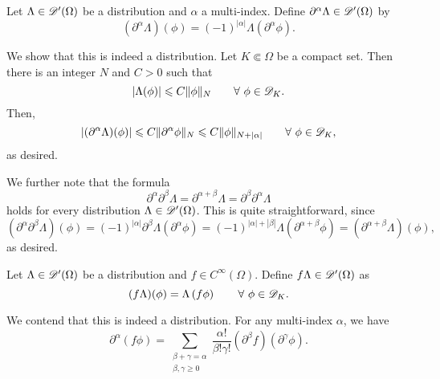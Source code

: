 \begin{definition}
    Let $\Lambda\in\mathscr{D}'(\Omega)$ be a distribution and $\alpha$ a multi-index. Define $\partial^\alpha\Lambda\in\mathscr{D}'(\Omega)$ by 
    \begin{equation*}
        \left(\partial^\alpha\Lambda\right)(\phi) = (-1)^{|\alpha|}\Lambda\left(\partial^\alpha\phi\right).
    \end{equation*}
\end{definition}

We show that this is indeed a distribution. Let $K\Subset\Omega$ be a compact set. Then there is an integer $N$ and $C > 0$ such that 
\begin{equation*}
    |\Lambda(\phi)|\leqslant C\|\phi\|_N\qquad\forall~\phi\in\mathscr{D}_K.
\end{equation*}
Then, 
\begin{equation*}
    \left|(\partial^\alpha\Lambda)(\phi)\right|\leqslant C\|\partial^\alpha\phi\|_N\leqslant C\|\phi\|_{N + |\alpha|}\qquad\forall~\phi\in\mathscr{D}_K,
\end{equation*}
as desired.

We further note that the formula 
\begin{equation*}
    \partial^\alpha\partial^\beta\Lambda = \partial^{\alpha + \beta}\Lambda = \partial^{\beta}\partial^\alpha\Lambda
\end{equation*}
holds for every distribution $\Lambda\in\mathscr{D}'(\Omega)$. This is quite straightforward, since 
\begin{equation*}
    \left(\partial^\alpha\partial^\beta\Lambda\right)(\phi) = (-1)^{|\alpha|}\partial^\beta\Lambda\left(\partial^\alpha\phi\right) = (-1)^{|\alpha| + |\beta|}\Lambda\left(\partial^{\alpha + \beta}\phi\right) = \left(\partial^{\alpha + \beta}\Lambda\right)(\phi),
\end{equation*}
as desired.

\begin{definition}
    Let $\Lambda\in\mathscr{D}'(\Omega)$ be a distribution and $f\in C^\infty(\Omega)$. Define $f\Lambda\in\mathscr{D}'(\Omega)$ as 
    \begin{equation*}
        (f\Lambda)(\phi) = \Lambda\left(f\phi\right)\qquad\forall~\phi\in\mathscr{D}_K.
    \end{equation*}
\end{definition}

We contend that this is indeed a distribution. For any multi-index $\alpha$, we have 
\begin{equation*}
    \partial^\alpha\left(f\phi\right) = \sum_{\substack{\beta + \gamma = \alpha\\\beta,\gamma\ge0}}\frac{\alpha!}{\beta!\gamma!}(\partial^\beta f)(\partial^\gamma\phi).
\end{equation*}

